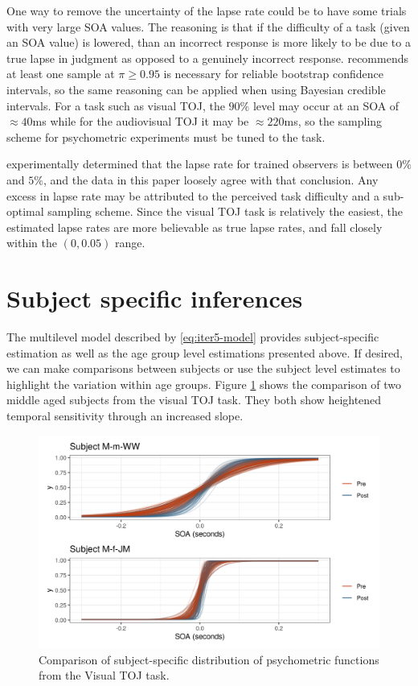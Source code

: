 \documentclass[11pt, oneside, openany]{scrbook}
\begin{document}
One way to remove the uncertainty of the lapse rate could be to have some trials with very large SOA values. The reasoning is that if the difficulty of a task (given an SOA value) is lowered, than an incorrect response is more likely to be due to a true lapse in judgment as opposed to a genuinely incorrect response. \citet{wichmann2001b} recommends at least one sample at \(\pi \ge 0.95\) is necessary for reliable bootstrap confidence intervals, so the same reasoning can be applied when using Bayesian credible intervals. For a task such as visual TOJ, the \(90\%\) level may occur at an SOA of \(\approx 40\)ms while for the audiovisual TOJ it may be \(\approx 220\)ms, so the sampling scheme for psychometric experiments must be tuned to the task.

\citet{wichmann2001a} experimentally determined that the lapse rate for trained observers is between \(0\%\) and \(5\%\), and the data in this paper loosely agree with that conclusion. Any excess in lapse rate may be attributed to the perceived task difficulty and a sub-optimal sampling scheme. Since the visual TOJ task is relatively the easiest, the estimated lapse rates are more believable as true lapse rates, and fall closely within the \((0, 0.05)\) range.

\hypertarget{subject-specific-inferences}{%
\section{Subject specific inferences}\label{subject-specific-inferences}}

The multilevel model described by \eqref{eq:iter5-model} provides subject-specific estimation as well as the age group level estimations presented above. If desired, we can make comparisons between subjects or use the subject level estimates to highlight the variation within age groups. Figure \ref{fig:ch050-Green-Metaphor} shows the comparison of two middle aged subjects from the visual TOJ task. They both show heightened temporal sensitivity through an increased slope.

\begin{figure}

{\centering \includegraphics[width=0.85\linewidth]{figures/ch050-Green-Metaphor} 

}

\caption{Comparison of subject-specific distribution of psychometric functions from the Visual TOJ task.}\label{fig:ch050-Green-Metaphor}
\end{figure}
\end{document}
